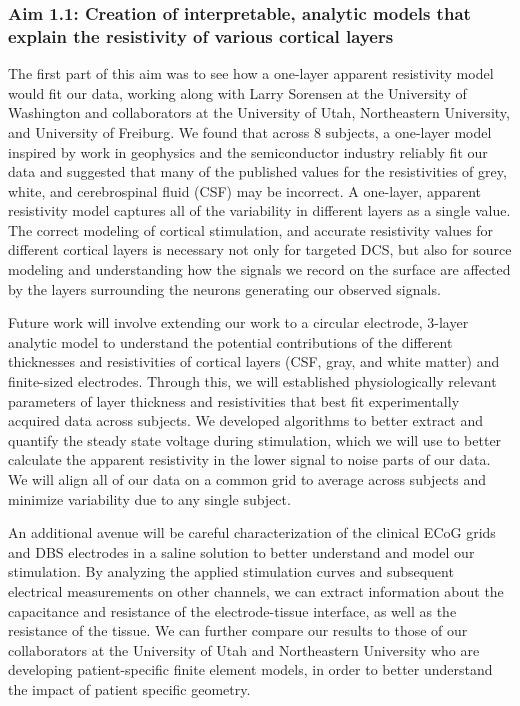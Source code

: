 \subsubsection{Aim 1.1: Creation of interpretable, analytic models that explain the resistivity of various cortical layers}

The first part of this aim was to see how a one-layer apparent resistivity model would fit our data, working along with Larry Sorensen at the University of Washington and collaborators at the University of Utah, Northeastern University, and University of Freiburg. We found that across 8 subjects, a one-layer model inspired by work in geophysics and the semiconductor industry \cite{Miccoli2015} reliably fit our data and suggested that many of the published values for the resistivities of grey, white, and cerebrospinal fluid (CSF) may be incorrect. A one-layer, apparent resistivity model captures all of the variability in different layers as a single value. The correct modeling of cortical stimulation, and accurate resistivity values for different cortical layers is necessary not only for targeted DCS, but also for source modeling and understanding how the signals we record on the surface are affected by the layers surrounding the neurons generating our observed signals. 

Future work will involve extending our work to a circular electrode, 3-layer analytic model \cite{Schumann1969a} to understand the potential contributions of the different thicknesses and resistivities of cortical layers (CSF, gray, and white matter) and finite-sized electrodes. Through this, we will established physiologically relevant parameters of layer thickness and resistivities that best fit experimentally acquired data across subjects. We developed algorithms to better extract and quantify the steady state voltage during stimulation, which we will use to better calculate the apparent resistivity in the lower signal to noise parts of our data. We will align all of our data on a common grid to average across subjects and minimize variability due to any single subject.  

An additional avenue will be careful characterization of the clinical ECoG grids and DBS electrodes in a saline solution to better understand and model our stimulation. By analyzing the applied stimulation curves and subsequent electrical measurements on other channels, we can extract information about the capacitance and resistance of the electrode-tissue interface, as well as the resistance of the tissue. We can further compare our results to those of our collaborators at the University of Utah and Northeastern University who are developing patient-specific finite element models, in order to better understand the impact of patient specific geometry. 


